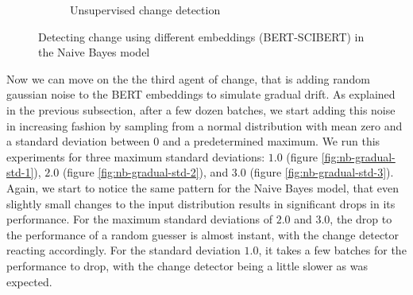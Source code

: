 \documentclass[12pt]{extreport}
\begin{document}
\begin{figure}[H]
\begin{subfigure}{.5\textwidth}
  \caption{Unsupervised change detection}
  \label{fig:nb-diff-embed-unsuper-B-S}
\end{subfigure}
\caption{Detecting change using different embeddings (BERT-SCIBERT) in the Naive Bayes model}
\label{fig:nb-diff-embed-B-S}
\end{figure}

Now we can move on the the third agent of change, that is adding random gaussian noise to the BERT embeddings to simulate gradual drift. As explained in the previous subsection, after a few dozen batches, we start adding this noise in increasing fashion by sampling from a normal distribution with mean zero and a standard deviation between 0 and a predetermined maximum. We run this experiments for three maximum standard deviations: $1.0$ (figure \ref{fig:nb-gradual-std-1}), $2.0$ (figure \ref{fig:nb-gradual-std-2}), and $3.0$ (figure \ref{fig:nb-gradual-std-3}). Again, we start to notice the same pattern for the Naive Bayes model, that even slightly small changes to the input distribution results in significant drops in its performance. For the maximum standard deviations of $2.0$ and $3.0$, the drop to the performance of a random guesser is almost instant, with the change detector reacting accordingly. For the standard deviation $1.0$, it takes a few batches for the performance to drop, with the change detector being a little slower as was expected.
\end{document}
